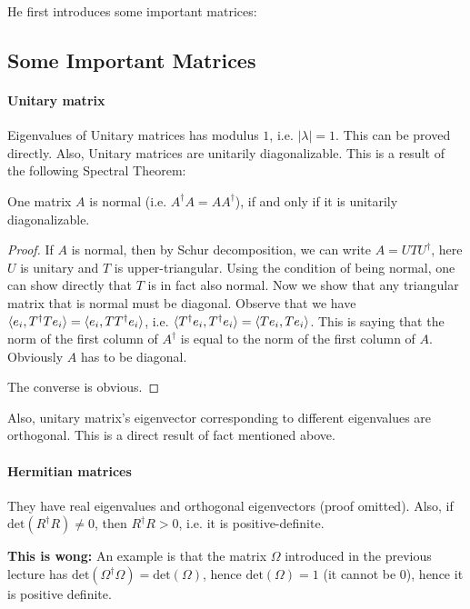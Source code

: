 He first introduces some important matrices:

\subsection{Some Important Matrices}
\label{sec:Some-Important-Matrices}

\paragraph{Unitary matrix} Eigenvalues of Unitary matrices has modulus $1$,
i.e. $|\lambda|=1$. This can be proved directly. Also, Unitary matrices are unitarily diagonalizable. This is a result of the following Spectral Theorem:
\begin{thm}
    One matrix $A$ is normal (i.e. $A^\dagger A= AA^\dagger$), if and only if it is unitarily diagonalizable.
\end{thm}
\begin{proof}
    If $A$ is normal, then by Schur decomposition, we can write
    $A=UTU^\dagger$, here $U$ is unitary and $T$ is upper-triangular. 
    Using the condition of being normal, one can show directly that $T$ 
    is in fact also normal. Now we show that any triangular matrix that 
    is normal must be diagonal. Observe that we have 
    $\braket{e_i,T^\dagger T e_i}=\braket{e_i,TT^\dagger e_i}$, 
    i.e. $\braket{T^\dagger e_i, T^\dagger e_i}=\braket{T e_i, T e_i}$. 
    This is saying that the norm of the first column of $A^\dagger$ 
    is equal to the norm of the first column of $A$. Obviously 
    $A$ has to be diagonal.

    The converse is obvious.
\end{proof}

Also, unitary matrix's eigenvector corresponding to different eigenvalues 
are orthogonal. This is a direct result of fact mentioned above.

\paragraph{Hermitian matrices} They have real eigenvalues and orthogonal
eigenvectors (proof omitted). Also, if $\text{det}(R^\dagger R)\neq 0$,
then $R^\dagger R >0$, i.e. it is positive-definite. 

\textbf{This is wong:} An example is that
the matrix $\Omega$ introduced in the previous lecture has
$\text{det}(\Omega^\dagger \Omega)=\text{det}(\Omega)$, hence
$\text{det}(\Omega)=1$ (it cannot be $0$), hence it is positive definite.

